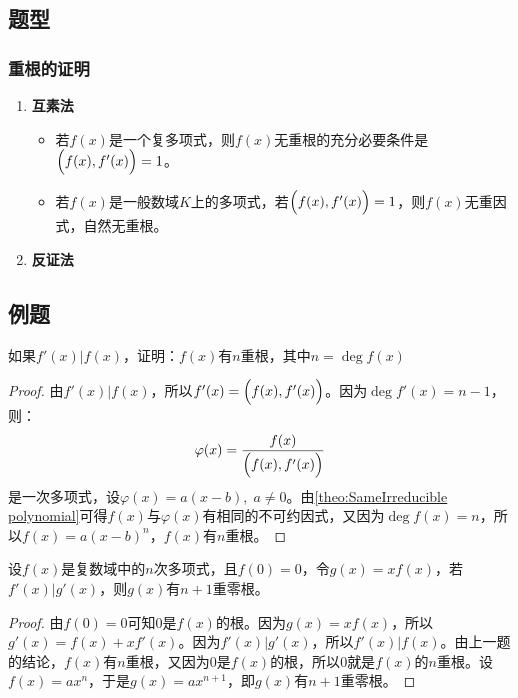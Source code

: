 \subsection{题型}
\subsubsection{重根的证明}
\begin{enumerate}
	\item \textbf{互素法}
	\begin{itemize}
		\item 若$f(x)$是一个复多项式，则$f(x)$无重根的充分必要条件是$\Bigl(f(x),f'(x)\Bigr)=1$。
		\item 若$f(x)$是一般数域$K$上的多项式，若$\Bigl(f(x),f'(x)\Bigr)=1$，则$f(x)$无重因式，自然无重根。
	\end{itemize}
	\item \textbf{反证法}
\end{enumerate}

\subsection{例题}
\begin{theorem}
	如果$f'(x)|f(x)$，证明：$f(x)$有$n$重根，其中$n=\operatorname{deg}f(x)$
\end{theorem}
\begin{proof}
	由$f'(x)|f(x)$，所以$f'(x)=\Bigl(f(x),f'(x)\Bigr)$。因为$\operatorname{deg}f'(x)=n-1$，则：
	\begin{equation*}
		\varphi(x)=\frac{f(x)}{\Bigl(f(x),f'(x)\Bigr)}
	\end{equation*}
	是一次多项式，设$\varphi(x)=a(x-b),\;a\ne0$。由\cref{theo:SameIrreducible polynomial}可得$f(x)$与$\varphi(x)$有相同的不可约因式，又因为$\operatorname{deg}f(x)=n$，所以$f(x)=a(x-b)^n$，$f(x)$有$n$重根。
\end{proof}
\begin{theorem}
	设$f(x)$是复数域中的$n$次多项式，且$f(0)=0$，令$g(x)=xf(x)$，若$f'(x)|g'(x)$，则$g(x)$有$n+1$重零根。
\end{theorem}
\begin{proof}
	由$f(0)=0$可知$0$是$f(x)$的根。因为$g(x)=xf(x)$，所以$g'(x)=f(x)+xf'(x)$。因为$f'(x)|g'(x)$，所以$f'(x)|f(x)$。由上一题的结论，$f(x)$有$n$重根，又因为$0$是$f(x)$的根，所以$0$就是$f(x)$的$n$重根。设$f(x)=ax^n$，于是$g(x)=ax^{n+1}$，即$g(x)$有$n+1$重零根。
\end{proof}

